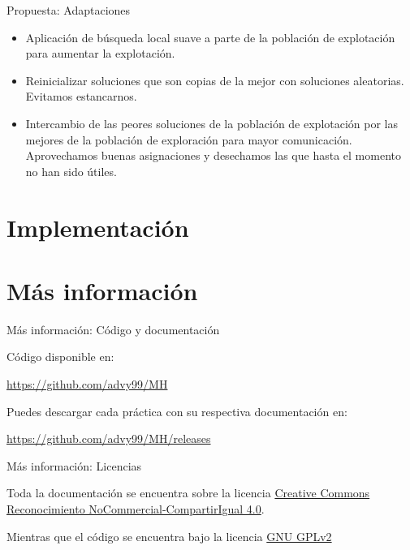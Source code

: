 \documentclass{beamer}
\begin{document}
\begin{frame}{Propuesta: Adaptaciones}

\begin{itemize}

\item Aplicación de búsqueda local suave a parte de la población de explotación para aumentar la explotación.

\item Reinicializar soluciones que son copias de la mejor con soluciones aleatorias. Evitamos estancarnos.

\item Intercambio de las peores soluciones de la población de explotación por las mejores de la población de exploración para mayor comunicación. Aprovechamos buenas asignaciones y desechamos las que hasta el momento no han sido útiles.

\end{itemize}

\end{frame}
  
  
  
\section{Implementación}
  
\section{Más información}
  
\begin{frame}{Más información: Código y documentación}

	Código disponible en: 
	
	\begin{center}
		\url{https://github.com/advy99/MH}	
	\end{center}
	
	Puedes descargar cada práctica con su respectiva documentación en:
	
	\begin{center}
		\url{https://github.com/advy99/MH/releases}	
	\end{center}

	
\end{frame}	  
  
\begin{frame}{Más información: Licencias}
  
	Toda la documentación se encuentra sobre la licencia
 	\href{https://creativecommons.org/licenses/by-nc-sa/4.0/deed.es}{Creative Commons
	Reconocimiento NoCommercial-CompartirIgual 4.0}.

	\begin{center}\ccbyncsa\end{center}

	\vspace{1cm}

	Mientras que el código se encuentra bajo la licencia \href{https://www.gnu.org/licenses/old-licenses/gpl-2.0.html}{GNU GPLv2}
  
\end{frame}
\end{document}
